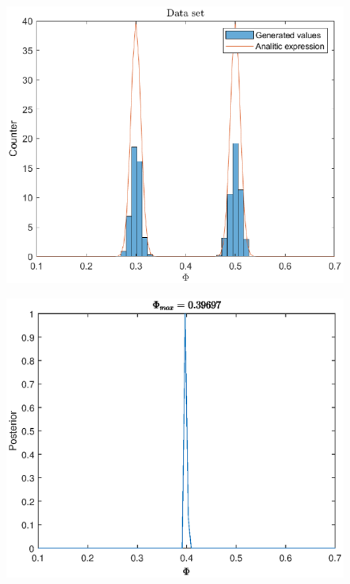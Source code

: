 \documentclass[a4paper,12pt,twoside,titlepage,openright]{book}
\begin{document}
		\begin{figure}
			\centering
			\includegraphics{validation/1paramData.eps}
			\caption{}
			\label{val: 1paramData}
		\end{figure}
		\begin{figure}
			\centering
			\includegraphics{validation/1param1.eps}
			\caption{}
			\label{val: 1param1}
		\end{figure}
\end{document}
